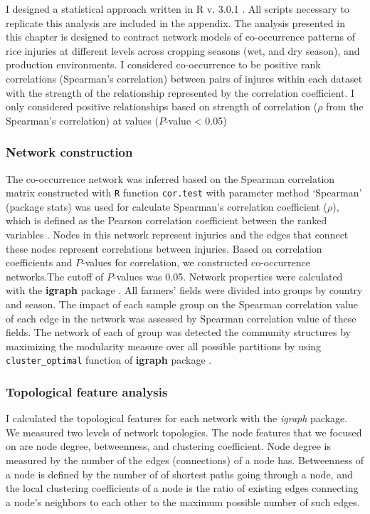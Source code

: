 I designed a statistical approach written in R v. 3.0.1 \citep{R_2015}. All scripts necessary to replicate this analysis are included in the appendix. The analysis presented in this chapter is designed to contract network models of co-occurrence patterns of rice injuries at different levels across cropping seasons (wet, and dry season), and production environments. I considered co-occurrence to be positive rank correlations (Spearman’s correlation) between pairs of injures within each dataset with the strength of the relationship represented by the correlation coefficient. I only considered positive relationships based on strength of correlation ($\rho$ from the Spearman’s correlation) at values ($P$-value < 0.05) 

\subsubsection{Network construction}

The co-occurrence network was inferred based on the Spearman correlation matrix constructed with \texttt{R} function \texttt{cor.test} with parameter method `Spearman' (package stats) was used for calculate Spearman's correlation coefficient ($\rho$), which is defined as the Pearson correlation coefficient between the ranked variables \cite{R_2015}. Nodes in this network represent injuries and the edges that connect these nodes represent correlations between injuries. Based on correlation coefficients and $P$-values for correlation, we constructed co-occurrence networks.The cutoff of $P$-values was 0.05. Network properties were calculated with the \textbf{igraph} package \citep{Csardi_2010_igraph}. All farmers' fields were divided into groups by country and season. The impact of each sample group on the Spearman correlation value of each edge in the network was assessed by Spearman correlation value of these fields. The network of each of group was detected the community structures by maximizing the modularity measure over all possible partitions by using \texttt{cluster\_optimal} function of \textbf{igraph} package \cite{Brandes_2008_Modularity}.

\subsubsection{Topological feature analysis}

I calculated the topological features for each network with the \textit{igraph} package. We measured two levels of network topologies. The node features that we focused on are node degree, betweenness, and clustering coefficient. Node degree is measured by the number of the edges (connections) of a node has. Betweenness of a node is defined by the number of of shortest paths going through a node, and the local clustering coefficients of a node is the ratio of existing edges connecting a node's neighbors to each other to the maximum possible number of such edges.

